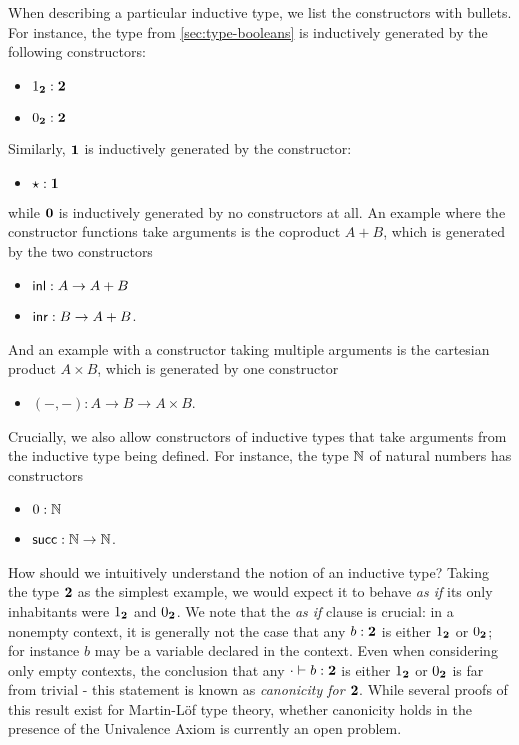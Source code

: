 When describing a particular inductive type, we list the constructors with bullets.
For instance, the type \bool from \autoref{sec:type-booleans} is inductively generated by the following constructors:
\begin{itemize}
\item $1_{\mathbf{2}}:\mathbf{2}$
\item $0_{\mathbf{2}}:\mathbf{2}$
\end{itemize}
Similarly, $\mathbf{1}$ is inductively generated by the constructor:
\begin{itemize}
\item $\star:\mathbf{1}$
\end{itemize}
while $\mathbf{0}$ is inductively generated by no constructors at all.
An example where the constructor functions take arguments is the coproduct $A+B$, which is generated by the two constructors
\begin{itemize}
\item $\mathsf{inl}:A\to A+B$
\item $\mathsf{inr}:B\to A+B$.
\end{itemize}
And an example with a constructor taking multiple arguments is the cartesian product $A\times B$, which is generated by one constructor
\begin{itemize}
\item $(-,-) : A\to B \to A\times B$.
\end{itemize}
Crucially, we also allow constructors of inductive types that take arguments from the inductive type being defined.
For instance, the type $\mathbb{N}$ of natural numbers has constructors
\begin{itemize}
\item $0:\mathbb{N}$
\item $\mathsf{succ}:\mathbb{N}\to\mathbb{N}$.
\end{itemize}

How should we intuitively understand the notion of an inductive type? Taking the type $\mathbf{2}$ as the simplest example, we would expect it to behave \emph{as if} its only inhabitants were $1_{\mathbf{2}}$ and $0_{\mathbf{2}}$. We note that the \emph{as if} clause is crucial: in a nonempty context, it is generally not the case that any $b : \mathbf{2}$ is either $1_{\mathbf{2}}$ or $0_{\mathbf{2}}$; for instance $b$ may be a variable declared in the context. Even when considering only empty contexts, the conclusion that any $\cdot \vdash b : \mathbf{2}$ is either $1_{\mathbf{2}}$ or $0_{\mathbf{2}}$ is far from trivial - this statement is known as \emph{canonicity for $\mathbf{2}$}. While several proofs of this result exist for Martin-L{\"o}f type theory, whether canonicity holds in the presence of the Univalence Axiom is currently an open problem.

